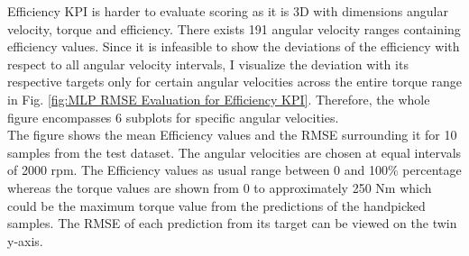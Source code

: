 \documentclass{report} %
\begin{document}
Efficiency \ac{KPI} is harder to evaluate scoring as it is 3\ac{D} with dimensions angular velocity, torque and efficiency. 
There exists 191 angular velocity ranges containing efficiency values.
Since it is infeasible to show the deviations of the efficiency with respect to all angular velocity intervals, I visualize the deviation with its respective targets 
only for certain angular velocities across the entire torque range in Fig. \ref{fig:MLP RMSE Evaluation for Efficiency KPI}. 
Therefore, the whole figure encompasses 6 subplots for specific angular velocities.\\
The figure shows the mean Efficiency values and the \ac{RMSE} surrounding it for 10 samples from the test dataset.
The angular velocities are chosen at equal intervals of 2000 rpm. The Efficiency values as usual range between 0 and 100\% percentage whereas the torque values are shown 
from 0 to approximately 250 Nm which could be the maximum torque value from the predictions of the handpicked samples.
The \ac{RMSE} of each prediction from its target can be viewed on the twin y-axis.\\
\end{document}

